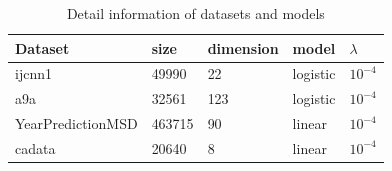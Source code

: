 \documentclass[conference]{IEEEtran}
\begin{document}
\begin{table}[]
\centering
\caption{Detail information of datasets and models}
\label{data information}
\begin{tabular}{|l|l|l|l|l|}
\hline
Dataset           & size & dimension & model & $\lambda$ \\ \hline
ijcnn1            &  49990 &  22 &   logistic    &  $10^{-4}$         \\
a9a               &   32561&123   &     logistic  &      $10^{-4}$     \\ 
YearPredictionMSD & 463715  &  90 &    linear  &      $10^{-4}$     \\
cadata              & 20640  &8   &     linear  &    $10^{-4}$       \\ \hline
\end{tabular}
\end{table}
\end{document}
